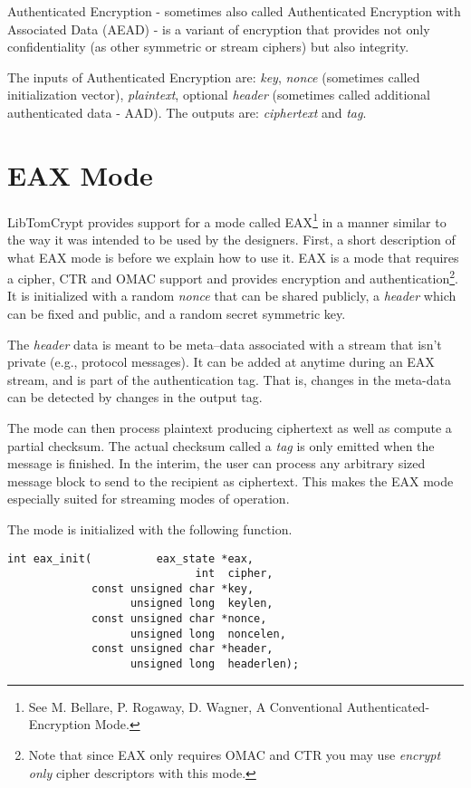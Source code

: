 \documentclass[synpaper]{book}
\newcommand{\mysection}[1]    %
	{                   %
	\section{#1}
   \markboth{\textsf{www.libtom.net}}{\thesection ~ {#1}}
	}
\begin{document}
Authenticated Encryption - sometimes also called Authenticated Encryption with Associated Data (AEAD) - is a variant of encryption
that provides not only confidentiality (as other symmetric or stream ciphers) but also integrity.

The inputs of Authenticated Encryption are: \textit{key}, \textit{nonce} (sometimes called initialization vector), \textit{plaintext},
optional \textit{header} (sometimes called additional authenticated data - AAD). The outputs are: \textit{ciphertext} and \textit{tag}.

\mysection{EAX Mode}
LibTomCrypt provides support for a mode called EAX\footnote{See
M. Bellare, P. Rogaway, D. Wagner, A Conventional Authenticated-Encryption Mode.} in a manner similar to the way it was intended to be used
by the designers.  First, a short description of what EAX mode is before we explain how to use it.  EAX is a mode that requires a cipher,
CTR and OMAC support and provides encryption and
authentication\footnote{Note that since EAX only requires OMAC and CTR you may use \textit{encrypt only} cipher descriptors with this mode.}.
It is initialized with a random \textit{nonce} that can be shared publicly, a \textit{header} which can be fixed and public, and a random secret symmetric key.

The \textit{header} data is meant to be meta--data associated with a stream that isn't private (e.g., protocol messages).  It can
be added at anytime during an EAX stream, and is part of the authentication tag.  That is, changes in the meta-data can be detected by changes in the output tag.

The mode can then process plaintext producing ciphertext as well as compute a partial checksum.  The actual checksum
called a \textit{tag} is only emitted when the message is finished.  In the interim, the user can process any arbitrary
sized message block to send to the recipient as ciphertext.  This makes the EAX mode especially suited for streaming modes
of operation.

The mode is initialized with the following function.
\begin{verbatim}
int eax_init(          eax_state *eax,
                             int  cipher,
             const unsigned char *key,
                   unsigned long  keylen,
             const unsigned char *nonce,
                   unsigned long  noncelen,
             const unsigned char *header,
                   unsigned long  headerlen);
\end{verbatim}
\end{document}
